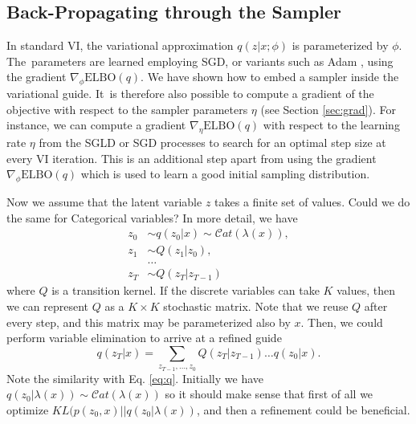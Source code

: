 \subsection*{Back-Propagating through the Sampler}\label{sec:tuning}

In standard VI, the variational approximation $q(z|x;\phi)$ is parameterized by $\phi$. The~parameters are learned employing SGD, or variants such as Adam \parencite{kingma2014adam}, using the gradient $\nabla_{\phi} \mbox{ELBO}(q)$. We have shown how to embed a sampler inside the variational guide. 
It~is therefore also possible to compute a gradient of the objective with respect to the sampler parameters $\eta$ (see Section \ref{sec:grad}). For instance, we can compute a gradient
$\nabla_{\eta} \mbox{ELBO}(q)$
with respect to the learning rate $\eta$ from the SGLD or SGD processes to search for an optimal step size at every VI iteration. This is an additional step apart from using the gradient $\nabla_{\phi} \mbox{ELBO}(q)$ which is used to learn a good initial sampling distribution.


\iffalse
Now we assume that the latent variable $z$ takes a finite set of values.
Could we do the same for Categorical variables?  In more detail, we have
\begin{align*}
z_0 &\sim q(z_0 | x) \sim \mathcal{C}at(\lambda({x})), \\
z_1 &\sim Q(z_1 | z_0), \\
&\ldots \\
z_{T} &\sim Q(z_T | z_{T-1})
\end{align*}
where $Q$ is a transition kernel. If the discrete variables can
take $K$ values, then we can represent $Q$ as a $K\times K$ stochastic
matrix. Note that we reuse $Q$ after every step, and this matrix 
may be parameterized also by ${x}$. Then, we could perform variable elimination to arrive at a refined guide 
$$
q(z_T | {x}) = \sum_{z_{T-1}, \ldots, z_0 } Q(z_T| z_{T-1}) \ldots q(z_0 | {x}).
$$
Note the similarity with Eq. \ref{eq:q}. Initially we have $q(z_0| \lambda(x)) \sim \mathcal{C}at(\lambda(x))$ so it should make sense that first of all we optimize $KL(p(z_0, x) || q(z_0 | \lambda(x))$, and then a refinement could be beneficial.

